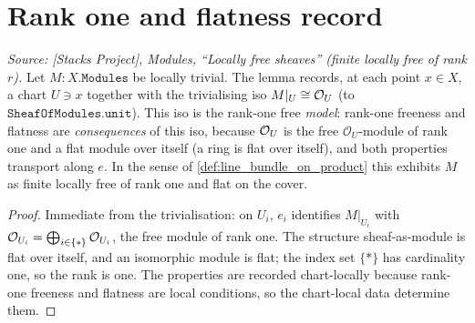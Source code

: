 \section{Rank one and flatness record}
\label{sec:lbc_rank_flat}


\begin{lemma}\leanok
  \label{lem:lbc_rank_flat}
  \textit{Source: [Stacks Project], Modules, ``Locally free sheaves'' (finite
  locally free of rank \(r\)).}
  Let \(M : X.\mathtt{Modules}\) be locally trivial. The lemma records, at each
  point \(x \in X\), a chart \(U \ni x\) together with the trivialising iso
  \(M|_U \cong \mathcal{O}_{U}\) (to \(\mathtt{SheafOfModules.unit}\)). This iso is the
  rank-one free \emph{model}: rank-one freeness and flatness are
  \emph{consequences} of this iso, because \(\mathcal{O}_{U}\) is the free
  \(\mathcal{O}_U\)-module of rank one and a flat module over itself (a ring is
  flat over itself), and both properties transport along \(e\). In the sense of
  \cref{def:line_bundle_on_product} this exhibits \(M\) as finite locally free
  of rank one and flat on the cover.
\end{lemma}

\begin{proof}
  \leanok
  Immediate from the trivialisation: on \(U_i\), \(e_i\) identifies \(M|_{U_i}\)
  with \(\mathcal{O}_{U_i} = \bigoplus_{i \in \{*\}} \mathcal{O}_{U_i}\), the free module
  of rank one. The structure sheaf-as-module is flat over itself, and an
  isomorphic module is flat; the index set \(\{*\}\) has cardinality one, so the
  rank is one. The properties are recorded chart-locally because rank-one
  freeness and flatness are local conditions, so the chart-local data determine
  them.
\end{proof}
